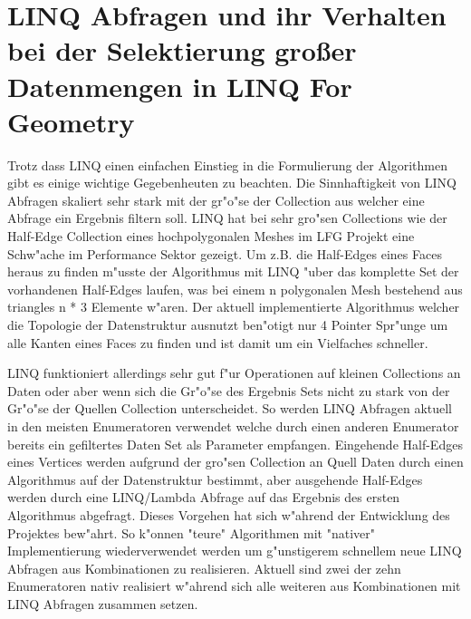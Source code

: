 \documentclass[pagesize, paper=a4, fontsize=12pt,titlepage=true, headings=small, headnosepline, abstractoff, liststotoc, nochapterprefix, plainheadsepline]{scrreprt}
\newcommand{\LFG}{LINQ For Geometry}
\begin{document}
	\section {LINQ Abfragen und ihr Verhalten bei der Selektierung großer Datenmengen in \LFG}
Trotz dass LINQ einen einfachen Einstieg in die Formulierung der Algorithmen gibt es einige wichtige Gegebenheuten zu beachten. Die Sinnhaftigkeit von LINQ Abfragen skaliert sehr stark mit der gr"o"se der Collection aus welcher eine Abfrage ein Ergebnis filtern soll. LINQ hat bei sehr gro"sen Collections wie der Half-Edge Collection eines hochpolygonalen Meshes im LFG Projekt eine Schw"ache im Performance Sektor gezeigt. Um z.B. die Half-Edges eines Faces heraus zu finden m"usste der Algorithmus mit LINQ "uber das komplette Set der vorhandenen Half-Edges laufen, was bei einem n polygonalen Mesh bestehend aus triangles n * 3 Elemente w"aren. Der aktuell implementierte Algorithmus welcher die Topologie der Datenstruktur ausnutzt ben"otigt nur 4 Pointer Spr"unge um alle Kanten eines Faces zu finden und ist damit um ein Vielfaches schneller.
\newline

LINQ funktioniert allerdings sehr gut f"ur Operationen auf kleinen Collections an Daten oder aber wenn sich die Gr"o"se des Ergebnis Sets nicht zu stark von der Gr"o"se der Quellen Collection unterscheidet. So werden LINQ Abfragen aktuell in den meisten Enumeratoren verwendet welche durch einen anderen Enumerator bereits ein gefiltertes Daten Set als Parameter empfangen. Eingehende Half-Edges eines Vertices werden aufgrund der gro"sen Collection an Quell Daten durch einen Algorithmus auf der Datenstruktur bestimmt, aber ausgehende Half-Edges werden durch eine LINQ/Lambda Abfrage auf das Ergebnis des ersten Algorithmus abgefragt. Dieses Vorgehen hat sich w"ahrend der Entwicklung des Projektes bew"ahrt. So k"onnen "teure" Algorithmen mit "nativer" Implementierung wiederverwendet werden um g"unstigerem schnellem neue LINQ Abfragen aus Kombinationen zu realisieren. Aktuell sind zwei der zehn Enumeratoren nativ realisiert w"ahrend sich alle weiteren aus Kombinationen mit LINQ Abfragen zusammen setzen.
\newline
\end{document}
